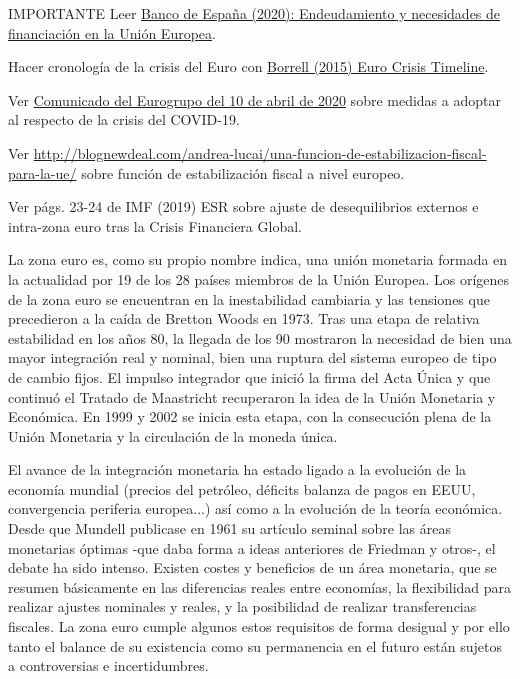 \documentclass{nuevotema}
\begin{document}
\ideaclave

IMPORTANTE Leer \href{https://www.bde.es/f/webbde/SES/Secciones/Publicaciones/PublicacionesSeriadas/DocumentosOcasionales/20/Fich/do2021.pdf}{Banco de España (2020): Endeudamiento y necesidades de financiación en la Unión Europea}.

Hacer cronología de la crisis del Euro con \href{https://www.ucm.es/data/cont/docs/518-2015-04-15-TIMELINE%20OCT%202009%20MAYO%202013_ampliado.pdf}{Borrell (2015) Euro Crisis Timeline}.

Ver \href{https://www.consilium.europa.eu/en/press/press-releases/2020/04/09/report-on-the-comprehensive-economic-policy-response-to-the-covid-19-pandemic/}{Comunicado del Eurogrupo del 10 de abril de 2020} sobre medidas a adoptar al respecto de la crisis del COVID-19.

Ver \url{http://blognewdeal.com/andrea-lucai/una-funcion-de-estabilizacion-fiscal-para-la-ue/} sobre función de estabilización fiscal a nivel europeo. 

Ver págs. 23-24 de IMF (2019) ESR sobre ajuste de desequilibrios externos e intra-zona euro tras la Crisis Financiera Global.

La zona euro es, como su propio nombre indica, una unión monetaria formada en la actualidad por 19 de los 28 países miembros de la Unión Europea. Los orígenes de la zona euro se encuentran en la inestabilidad cambiaria y las tensiones que precedieron a la caída de Bretton Woods en 1973. Tras una etapa de relativa estabilidad en los años 80, la llegada de los 90 mostraron la necesidad de bien una mayor integración real y nominal, bien una ruptura del sistema europeo de tipo de cambio fijos. El impulso integrador que inició la firma del Acta Única y que continuó el Tratado de Maastricht recuperaron la idea de la Unión Monetaria y Económica. En 1999 y 2002 se inicia esta etapa, con la consecución plena de la Unión Monetaria y la circulación de la moneda única.

El avance de la integración monetaria ha estado ligado a la evolución de la economía mundial (precios del petróleo, déficits balanza de pagos en EEUU, convergencia periferia europea...) así como a la evolución de la teoría económica. Desde que Mundell publicase en 1961 su artículo seminal sobre las áreas monetarias óptimas -que daba forma a ideas anteriores de Friedman y otros-, el debate ha sido intenso. Existen costes y beneficios de un área monetaria, que se resumen básicamente en las diferencias reales entre economías, la flexibilidad para realizar ajustes nominales y reales, y la posibilidad de realizar transferencias fiscales. La zona euro cumple algunos estos requisitos de forma desigual y por ello tanto el balance de su existencia como su permanencia en el futuro están sujetos a controversias e incertidumbres.
\end{document}

